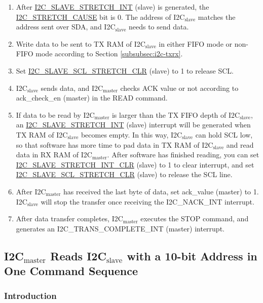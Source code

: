 \documentclass[main\_\_EN.tex]{subfiles}
\begin{document}
\begin{enumerate}
\item After \hyperref[int:i2c-slave-stretch]{I2C\_SLAVE\_STRETCH\_INT} (slave) is generated, the \hyperref[fielddesc:I2CSTRETCHCAUSE]{I2C\_STRETCH\_CAUSE} bit is 0. The address of I2C$_\text{slave}$ matches the address sent over SDA, and I2C$_\text{slave}$ needs to send data.
\item Write data to be sent to TX RAM of I2C$_\text{slave}$ in either FIFO mode or non-FIFO mode according to Section \ref{subsubsec:i2c-txrx}.
\item Set \hyperref[fielddesc:I2CSLAVESCLSTRETCHCLR]{I2C\_SLAVE\_SCL\_STRETCH\_CLR} (slave) to 1 to release SCL.
\item I2C$_\text{slave}$ sends data, and I2C$_\text{master}$ checks ACK value or not according to ack\_check\_en (master) in the READ command.
\item If data to be read by I2C$_\text{master}$ is larger than the TX FIFO depth of I2C$_\text{slave}$, an \hyperref[int:i2c-slave-stretch]{I2C\_SLAVE\_STRETCH\_INT} (slave) interrupt will be generated when TX RAM of I2C$_\text{slave}$ becomes empty. In this way, I2C$_\text{slave}$ can hold SCL low, so that software has more time to pad data in TX RAM of I2C$_\text{slave}$ and read data in RX RAM of I2C$_\text{master}$. After software has finished reading, you can set \hyperref[fielddesc:I2CSLAVESTRETCHINTCLR]{I2C\_SLAVE\_STRETCH\_INT\_CLR} (slave) to 1 to clear interrupt, and set \hyperref[fielddesc:I2CSLAVESCLSTRETCHCLR]{I2C\_SLAVE\_SCL\_STRETCH\_CLR} (slave) to release the SCL line.
\item After I2C$_\text{master}$ has received the last byte of data, set ack\_value (master) to 1. I2C$_\text{slave}$ will stop the transfer once receiving the I2C\_NACK\_INT interrupt.
\item After data transfer completes, I2C$_\text{master}$ executes the STOP command, and generates an I2C\_TRANS\_COMPLETE\_INT (master) interrupt.
\end{enumerate}

\subsection{\texorpdfstring{I2C$_\text{master}$ Reads I2C$_\text{slave}$ with a 10-bit Address in One Command Sequence}{I2C master Reads I2C slave with a 10-bit Address in One Command Sequence}}

\subsubsection{Introduction}
\end{document}
